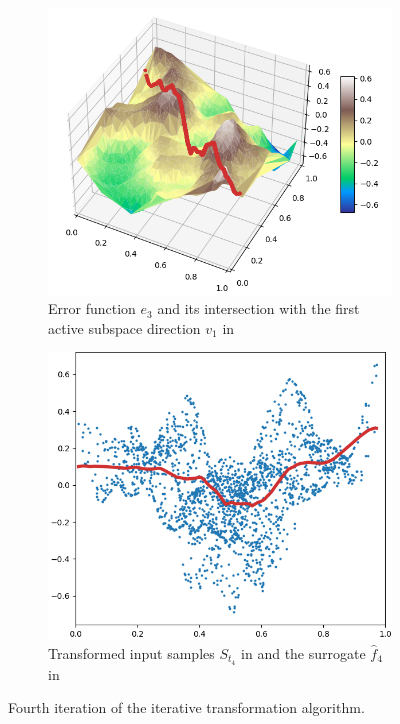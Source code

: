\documentclass[
  a4paper,  %
  twoside,  %
  bibliography=totoc,
  headsepline,
  cleardoublepage=empty,
  parskip=half,
  draft=false
]{scrbook}
\begin{document}
\begin{mdframed}[style=style]
\begin{figure}[H]
\begin{subfigure}{.5\textwidth}
  \centering
  \includegraphics[width=.75\linewidth]{graphics/pipeline_current_4.png}
  \caption{Error function $e_3$ and its intersection with the first active subspace direction $v_1$ in \reddot}
\end{subfigure}%
\begin{subfigure}{.5\textwidth}
  \centering
  \includegraphics[width=.75\linewidth]{graphics/pipeline_local_4.png}
  \caption{Transformed input samples $S_{t_4}$ in \blue and the surrogate $\hat{f}_4$ in \reddot}
\end{subfigure}
\delimit
\caption{Fourth iteration of the iterative transformation algorithm.}
\label{fig:pipeline_4}
\end{figure}
\end{mdframed}

\newpage
\end{document}
